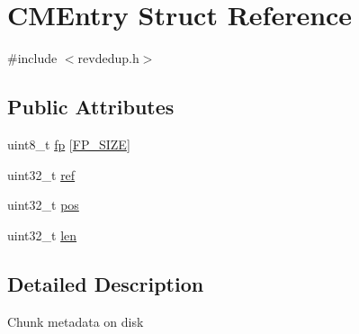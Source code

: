 \hypertarget{structCMEntry}{\section{\-C\-M\-Entry \-Struct \-Reference}
\label{structCMEntry}
}


{\ttfamily \#include $<$revdedup.\-h$>$}

\subsection*{\-Public \-Attributes}
\begin{DoxyCompactItemize}
\item 
uint8\-\_\-t \hyperlink{structCMEntry_a4edfc6334502a1563f4b0e0737bf7134}{fp} \mbox{[}\hyperlink{revdedup_8h_a5147a30bb976e44355fd0559f9d10abe}{\-F\-P\-\_\-\-S\-I\-Z\-E}\mbox{]}
\item 
uint32\-\_\-t \hyperlink{structCMEntry_ac57dde891eb1232477653a7775aa0b55}{ref}
\item 
uint32\-\_\-t \hyperlink{structCMEntry_a4fd391c9e176a8a0b6ff58134d39917d}{pos}
\item 
uint32\-\_\-t \hyperlink{structCMEntry_aaf3dd315b41ef4381c27ec6ce7a65f8f}{len}
\end{DoxyCompactItemize}


\subsection{\-Detailed \-Description}
\-Chunk metadata on disk 

